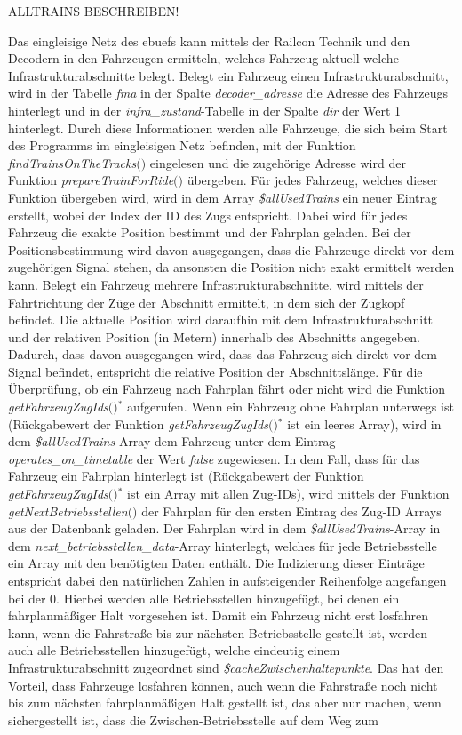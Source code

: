 ALLTRAINS BESCHREIBEN!

Das eingleisige Netz des \acp{ebuef} kann mittels der Railcon Technik und den Decodern in den Fahrzeugen ermitteln, welches Fahrzeug aktuell welche Infrastrukturabschnitte belegt. Belegt ein Fahrzeug einen Infrastrukturabschnitt, wird in der Tabelle \textit{fma} in der Spalte \textit{decoder\_adresse} die Adresse des Fahrzeugs hinterlegt und in der \textit{infra\_zustand}-Tabelle in der Spalte \textit{dir} der Wert 1 hinterlegt. Durch diese Informationen werden alle Fahrzeuge, die sich beim Start des Programms im eingleisigen Netz befinden, mit der Funktion \textit{find\-Trains\-On\-The\-Tracks$($$)$} eingelesen und die zugehörige Adresse wird der Funktion \textit{prepare\-Train\-For\-Ride$($$)$} übergeben. Für jedes Fahrzeug, welches dieser Funktion übergeben wird, wird in dem Array \textit{\$allUsedTrains} ein neuer Eintrag erstellt, wobei der Index der ID des Zugs entspricht. Dabei wird für jedes Fahrzeug die exakte Position bestimmt und der Fahrplan geladen. Bei der Positionsbestimmung wird davon ausgegangen, dass die Fahrzeuge direkt vor dem zugehörigen Signal stehen, da ansonsten die Position nicht exakt ermittelt werden kann. Belegt ein Fahrzeug mehrere Infrastrukturabschnitte, wird mittels der Fahrtrichtung der Züge der Abschnitt ermittelt, in dem sich der Zugkopf befindet. Die aktuelle Position wird daraufhin mit dem Infrastrukturabschnitt und der relativen Position (in Metern) innerhalb des Abschnitts angegeben. Dadurch, dass davon ausgegangen wird, dass das Fahrzeug sich direkt vor dem Signal befindet, entspricht die relative Position der Abschnittslänge. Für die Überprüfung, ob ein Fahrzeug nach Fahrplan fährt oder nicht wird die Funktion \textit{get\-Fahrzeug\-ZugIds$($$)$}$^\ast$ aufgerufen. Wenn ein Fahrzeug ohne Fahrplan unterwegs ist (Rückgabewert der Funktion \textit{get\-Fahrzeug\-ZugIds$($$)$}$^\ast$ ist ein leeres Array), wird in dem \textit{\$allUsedTrains}-Array dem Fahrzeug unter dem Eintrag \textit{operates\_on\_timetable} der Wert \textit{false} zugewiesen. In dem Fall, dass für das Fahrzeug ein Fahrplan hinterlegt ist (Rückgabewert der Funktion \textit{get\-Fahrzeug\-ZugIds$($$)$}$^\ast$ ist ein Array mit allen Zug-IDs), wird mittels der Funktion \textit{getNextBetriebsstellen$($$)$} der Fahrplan für den ersten Eintrag des Zug-ID Arrays aus der Datenbank geladen. Der Fahrplan wird in dem \textit{\$allUsedTrains}-Array in dem \textit{next\_betriebsstellen\_data}-Array hinterlegt, welches für jede Betriebsstelle ein Array mit den benötigten Daten enthält. Die Indizierung dieser Einträge entspricht dabei den natürlichen Zahlen in aufsteigender Reihenfolge angefangen bei der 0. Hierbei werden alle Betriebsstellen hinzugefügt, bei denen ein fahrplanmäßiger Halt vorgesehen ist. Damit ein Fahrzeug nicht erst losfahren kann, wenn die Fahrstraße bis zur nächsten Betriebsstelle gestellt ist, werden auch alle Betriebsstellen hinzugefügt, welche eindeutig einem Infrastrukturabschnitt zugeordnet sind \textit{\$cacheZwischenhaltepunkte}. Das hat den Vorteil, dass Fahrzeuge losfahren können, auch wenn die Fahrstraße noch nicht bis zum nächsten fahrplanmäßigen Halt gestellt ist, das aber nur machen, wenn sichergestellt ist, dass die Zwischen-Betriebsstelle auf dem Weg zum 